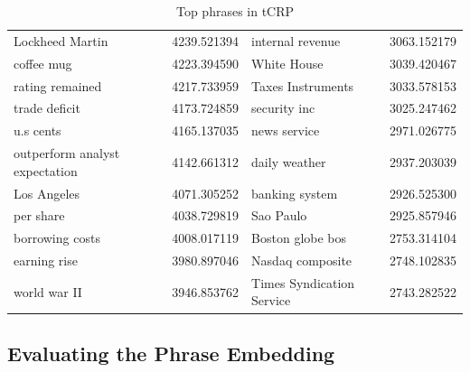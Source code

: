\begin{table}[h]
\begin{tabular}{lc|lc}
    Lockheed Martin                         & 4239.521394 &    internal revenue                        & 3063.152179  \\
    coffee mug                              & 4223.394590 &    White House                             & 3039.420467  \\
    rating remained                         & 4217.733959 &    Taxes Instruments                       & 3033.578153  \\
    trade deficit                           & 4173.724859 &    security inc                            & 3025.247462  \\
    u.s cents                               & 4165.137035 &    news service                            & 2971.026775  \\
    outperform analyst expectation          & 4142.661312 &    daily weather                           & 2937.203039  \\
    Los Angeles                             & 4071.305252 &    banking system                          & 2926.525300  \\
    per share                               & 4038.729819 &    Sao Paulo                               & 2925.857946  \\
    borrowing costs                         & 4008.017119 &    Boston globe bos                        & 2753.314104  \\
    earning rise                            & 3980.897046 &    Nasdaq composite                        & 2748.102835  \\
    world war II                            & 3946.853762 &    Times Syndication Service               & 2743.282522  \\
  \end{tabular}
  \caption{Top phrases in tCRP}
  \label{tab::plans_top_tcrp}
\end{table}

\subsection{Evaluating the Phrase Embedding}

